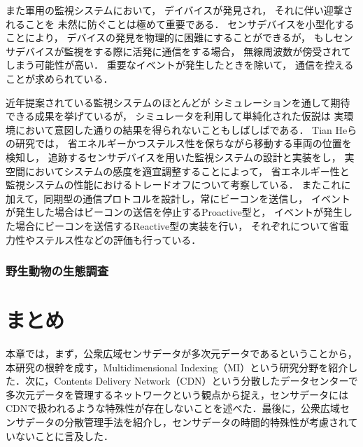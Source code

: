 また軍用の監視システムにおいて，
デイバイスが発見され，
それに伴い迎撃されることを
未然に防ぐことは極めて重要である．
センサデバイスを小型化することにより，
デバイスの発見を物理的に困難にすることができるが，
もしセンサデバイスが監視をする際に活発に通信をする場合，
無線周波数が傍受されてしまう可能性が高い．
重要なイベントが発生したときを除いて，
通信を控えることが求められている．

近年提案されている監視システムのほとんどが
シミュレーションを通して期待できる成果を挙げているが，
シミュレータを利用して単純化された仮説は
実環境において意図した通りの結果を得られないこともしばしばである．
Tian Heらの研究\cite{He04energy-efficientsurveillance}では，
省エネルギーかつステルス性を保ちながら移動する車両の位置を検知し，
追跡するセンサデバイスを用いた監視システムの設計と実装をし，
実空間においてシステムの感度を適宜調整することによって，
省エネルギー性と監視システムの性能におけるトレードオフについて考察している．
またこれに加えて，同期型の通信プロトコルを設計し，常にビーコンを送信し，
イベントが発生した場合はビーコンの送信を停止するProactive型と，
イベントが発生した場合にビーコンを送信するReactive型の実装を行い，
それぞれについて省電力性やステルス性などの評価も行っている．


\subsubsection{野生動物の生態調査}

\vspace{0.5em}




\section{まとめ}
本章では，まず，公衆広域センサデータが多次元データであるということから，本研究の根幹を成す，Multidimensional Indexing（MI）という研究分野を紹介した．次に，Contents Delivery Network（CDN）という分散したデータセンターで多次元データを管理するネットワークという観点から捉え，センサデータにはCDNで扱われるような特殊性が存在しないことを述べた．最後に，公衆広域センサデータの分散管理手法を紹介し，センサデータの時間的特殊性が考慮されていないことに言及した．
